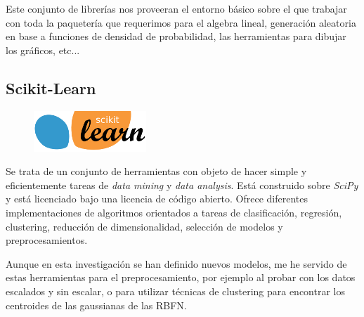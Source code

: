 \documentclass[10pt,a4paper]{report}
\begin{document}
Este conjunto de librerías nos proveeran el entorno básico sobre el que trabajar con toda la paquetería que requerimos para el algebra lineal, generación aleatoria en base a funciones de densidad de probabilidad, las herramientas para dibujar los gráficos, etc...

\subsection{Scikit-Learn\cite{scikitlearn2014}}
\begin{figure}[!h]{}
    \centering
    \includegraphics[scale=0.6]{img/scikit-learn-logo-small.png}
\end{figure}
Se trata de un conjunto de herramientas con objeto de hacer simple y eficientemente tareas de \textit{data mining} y \textit{data analysis}. Está construido sobre \textit{SciPy} y está licenciado bajo una licencia de código abierto. Ofrece diferentes implementaciones de algoritmos orientados a tareas de clasificación, regresión, clustering, reducción de dimensionalidad, selección de modelos y preprocesamientos.

Aunque en esta investigación se han definido nuevos modelos, me he servido de estas herramientas para el preprocesamiento, por ejemplo al probar con los datos escalados y sin escalar, o para utilizar técnicas de clustering para encontrar los centroides de las gaussianas de las RBFN.
\end{document}
